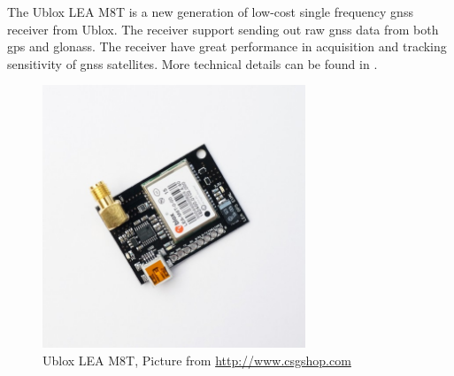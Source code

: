 The Ublox LEA M8T is a new generation of low-cost single frequency \gls{gnss} receiver from Ublox. The receiver support sending out raw \gls{gnss} data from both \gls{gps} and \gls{glonass}. The receiver have great performance in acquisition and tracking sensitivity of \gls{gnss} satellites. More technical details can be found in  \citep{UbloxDataSheet,UbloxReceiverDescription}.
\begin{figure}[H]
	\centering
		\includegraphics[width=0.7\textwidth]{figs/ubloxLeaM8T.jpg}
		\caption{Ublox LEA M8T, Picture from \url{http://www.csgshop.com}}
		\label{figure:Ublox}
\end{figure}
